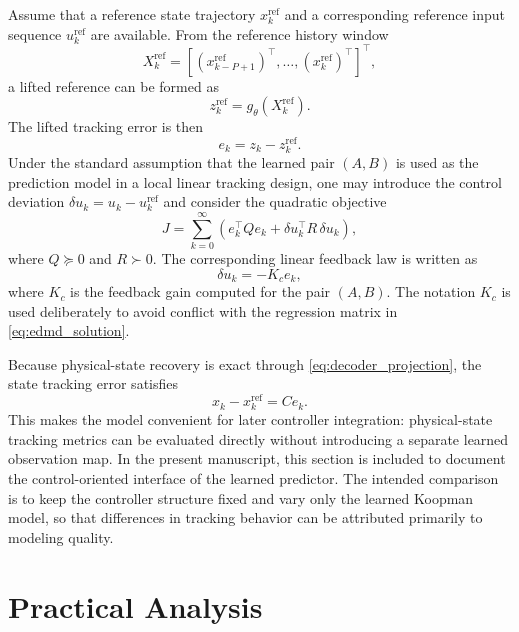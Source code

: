 \documentclass[journal]{IEEEtran}
\begin{document}
Assume that a reference state trajectory $x_k^{\mathrm{ref}}$ and a corresponding reference input sequence $u_k^{\mathrm{ref}}$ are available. From the reference history window
\begin{equation}
    X_k^{\mathrm{ref}} = [(x_{k-P+1}^{\mathrm{ref}})^\top,\ldots,(x_k^{\mathrm{ref}})^\top]^\top,
\end{equation}
a lifted reference can be formed as
\begin{equation}
    z_k^{\mathrm{ref}} = g_\theta(X_k^{\mathrm{ref}}).
    \label{eq:reference_lifting}
\end{equation}
The lifted tracking error is then
\begin{equation}
    e_k = z_k - z_k^{\mathrm{ref}}.
    \label{eq:tracking_error}
\end{equation}
Under the standard assumption that the learned pair $(A,B)$ is used as the prediction model in a local linear tracking design, one may introduce the control deviation $\delta u_k=u_k-u_k^{\mathrm{ref}}$ and consider the quadratic objective
\begin{equation}
    J = \sum_{k=0}^{\infty}
    \left(e_k^\top Q e_k + \delta u_k^\top R\,\delta u_k\right),
    \label{eq:lqr_objective}
\end{equation}
where $Q\succeq 0$ and $R\succ 0$. The corresponding linear feedback law is written as
\begin{equation}
    \delta u_k = -K_c e_k,
    \label{eq:lqr_control}
\end{equation}
where $K_c$ is the feedback gain computed for the pair $(A,B)$. The notation $K_c$ is used deliberately to avoid conflict with the regression matrix in \eqref{eq:edmd_solution}.

Because physical-state recovery is exact through \eqref{eq:decoder_projection}, the state tracking error satisfies
\begin{equation}
    x_k - x_k^{\mathrm{ref}} = C e_k.
\end{equation}
This makes the model convenient for later controller integration: physical-state tracking metrics can be evaluated directly without introducing a separate learned observation map. In the present manuscript, this section is included to document the control-oriented interface of the learned predictor. The intended comparison is to keep the controller structure fixed and vary only the learned Koopman model, so that differences in tracking behavior can be attributed primarily to modeling quality.

\section{Practical Analysis}
\label{sec:analysis}
\end{document}
